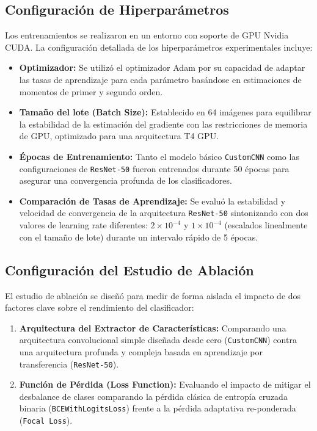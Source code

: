 \subsection{Configuración de Hiperparámetros}
Los entrenamientos se realizaron en un entorno con soporte de GPU Nvidia CUDA. La configuración detallada de los hiperparámetros experimentales incluye:
\begin{itemize}
    \item \textbf{Optimizador:} Se utilizó el optimizador Adam por su capacidad de adaptar las tasas de aprendizaje para cada parámetro basándose en estimaciones de momentos de primer y segundo orden.
    \item \textbf{Tamaño del lote (Batch Size):} Establecido en 64 imágenes para equilibrar la estabilidad de la estimación del gradiente con las restricciones de memoria de GPU, optimizado para una arquitectura T4 GPU.
    \item \textbf{Épocas de Entrenamiento:} Tanto el modelo básico \texttt{CustomCNN} como las configuraciones de \texttt{ResNet-50} fueron entrenados durante 50 épocas para asegurar una convergencia profunda de los clasificadores.
    \item \textbf{Comparación de Tasas de Aprendizaje:} Se evaluó la estabilidad y velocidad de convergencia de la arquitectura \texttt{ResNet-50} sintonizando con dos valores de learning rate diferentes: $2 \times 10^{-4}$ y $1 \times 10^{-4}$ (escalados linealmente con el tamaño de lote) durante un intervalo rápido de 5 épocas.
\end{itemize}

\subsection{Configuración del Estudio de Ablación}
El estudio de ablación se diseñó para medir de forma aislada el impacto de dos factores clave sobre el rendimiento del clasificador:
\begin{enumerate}
    \item \textbf{Arquitectura del Extractor de Características:} Comparando una arquitectura convolucional simple diseñada desde cero (\texttt{CustomCNN}) contra una arquitectura profunda y compleja basada en aprendizaje por transferencia (\texttt{ResNet-50}).
    \item \textbf{Función de Pérdida (Loss Function):} Evaluando el impacto de mitigar el desbalance de clases comparando la pérdida clásica de entropía cruzada binaria (\texttt{BCEWithLogitsLoss}) frente a la pérdida adaptativa re-ponderada (\texttt{Focal Loss}).
\end{enumerate}
